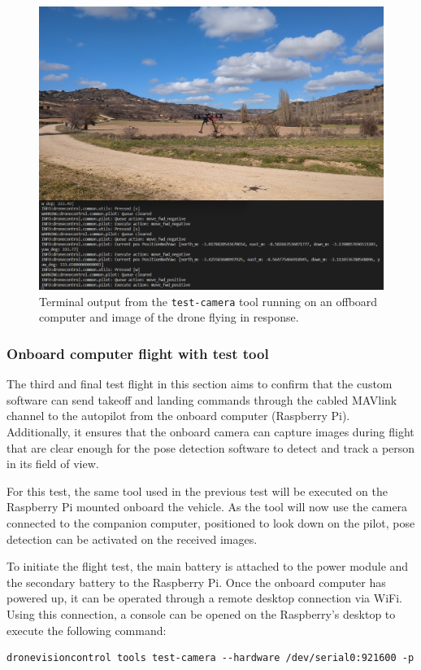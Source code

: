 \begin{figure}[H]
  \centering
  \includegraphics[width=\textwidth, keepaspectratio]{img/video-field-test-offboard.png}
  \caption{Terminal output from the \texttt{test-camera} tool running on an offboard computer and image of the drone flying in response.}
  \label{fig:flight-test-cam-offboard}
\end{figure}

\subsubsection{Onboard computer flight with test tool}
\label{subsec:fl-test-3}


The third and final test flight in this section aims to confirm that the custom software can send takeoff and landing commands through the cabled MAVlink channel to the autopilot from the onboard computer (Raspberry Pi). Additionally, it ensures that the onboard camera can capture images during flight that are clear enough for the pose detection software to detect and track a person in its field of view.

For this test, the same tool used in the previous test will be executed on the Raspberry Pi mounted onboard the vehicle. As the tool will now use the camera connected to the companion computer, positioned to look down on the pilot, pose detection can be activated on the received images.

To initiate the flight test, the main battery is attached to the power module and the secondary battery to the Raspberry Pi. Once the onboard computer has powered up, it can be operated through a remote desktop connection via WiFi. Using this connection, a console can be opened on the Raspberry's desktop to execute the following command:
\begin{verbatim}
dronevisioncontrol tools test-camera --hardware /dev/serial0:921600 -p
\end{verbatim}


